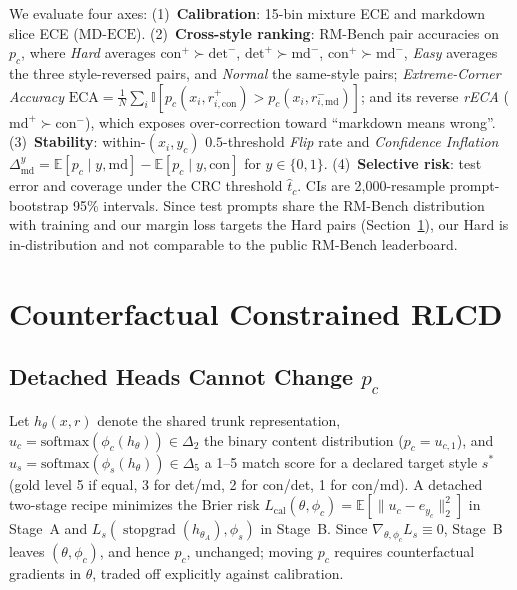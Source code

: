 \documentclass[letterpaper]{article} %
\begin{document}
We evaluate four axes: (1)~\textbf{Calibration}: 15-bin mixture ECE and markdown slice ECE ($\mathrm{MD\text{-}ECE}$). (2)~\textbf{Cross-style ranking}: RM-Bench pair accuracies on $p_c$, where \emph{Hard} averages $\mathrm{con}^+{\succ}\mathrm{det}^-$, $\mathrm{det}^+{\succ}\mathrm{md}^-$, $\mathrm{con}^+{\succ}\mathrm{md}^-$, \emph{Easy} averages the three style-reversed pairs, and \emph{Normal} the same-style pairs; \emph{Extreme-Corner Accuracy} $\mathrm{ECA}=\frac{1}{N}\sum_{i} \mathbb{I}[p_c(x_i,r^+_{i,\mathrm{con}})>p_c(x_i,r^-_{i,\mathrm{md}})]$; and its reverse \emph{rECA} ($\mathrm{md}^+{\succ}\mathrm{con}^-$), which exposes over-correction toward ``markdown means wrong''. (3)~\textbf{Stability}: within-$(x_i,y_c)$ $0.5$-threshold \emph{Flip} rate and \emph{Confidence Inflation} $\Delta^{y}_{\mathrm{md}}=\mathbb{E}[p_c\mid y,\mathrm{md}]-\mathbb{E}[p_c\mid y,\mathrm{con}]$ for $y\in\{0,1\}$. (4)~\textbf{Selective risk}: test error and coverage under the CRC threshold $\hat{t}_c$. CIs are 2,000-resample prompt-bootstrap 95\% intervals. Since test prompts share the RM-Bench distribution with training and our margin loss targets the Hard pairs (Section~\ref{sec:method}), our Hard is in-distribution and not comparable to the public RM-Bench leaderboard.

\section{Counterfactual Constrained RLCD}
\label{sec:method}

\subsection{Detached Heads Cannot Change $p_c$}

Let $h_\theta(x,r)$ denote the shared trunk representation, $u_c=\mathrm{softmax}(\phi_c(h_\theta))\in\Delta_2$ the binary content distribution ($p_c=u_{c,1}$), and $u_s=\mathrm{softmax}(\phi_s(h_\theta))\in\Delta_5$ a 1--5 match score for a declared target style $s^\ast$ (gold level 5 if equal, 3 for det/md, 2 for con/det, 1 for con/md). A detached two-stage recipe minimizes the Brier risk $L_{\mathrm{cal}}(\theta,\phi_c)=\mathbb{E}[\|u_c-e_{y_c}\|_2^2]$ in Stage~A and $L_s(\operatorname{stopgrad}(h_{\theta_A}),\phi_s)$ in Stage~B. Since $\nabla_{\theta,\phi_c} L_s \equiv 0$, Stage~B leaves $(\theta,\phi_c)$, and hence $p_c$, unchanged; moving $p_c$ requires counterfactual gradients in $\theta$, traded off explicitly against calibration.
\end{document}
